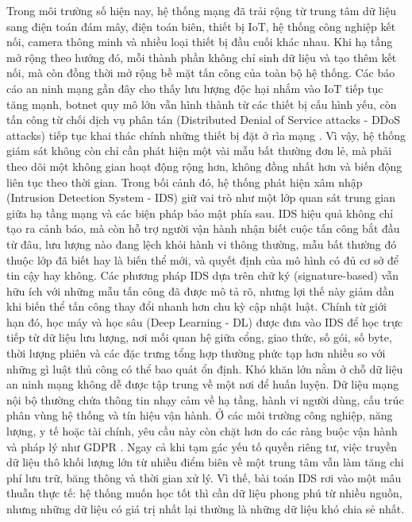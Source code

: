 Trong môi trường số hiện nay, hệ thống mạng đã trải rộng từ trung tâm dữ liệu sang điện toán đám mây, điện toán biên, thiết bị IoT, hệ thống công nghiệp kết nối, camera thông minh và nhiều loại thiết bị đầu cuối khác nhau. Khi hạ tầng mở rộng theo hướng đó, mỗi thành phần không chỉ sinh dữ liệu và tạo thêm kết nối, mà còn đồng thời mở rộng bề mặt tấn công của toàn bộ hệ thống. Các báo cáo an ninh mạng gần đây cho thấy lưu lượng độc hại nhắm vào IoT tiếp tục tăng mạnh, botnet quy mô lớn vẫn hình thành từ các thiết bị cấu hình yếu, còn tấn công từ chối dịch vụ phân tán (Distributed Denial of Service attacks - DDoS attacks) tiếp tục khai thác chính những thiết bị đặt ở rìa mạng \cite{sonicwall2024report,netgear2024report,hackernews2026report}. Vì vậy, hệ thống giám sát không còn chỉ cần phát hiện một vài mẫu bất thường đơn lẻ, mà phải theo dõi một không gian hoạt động rộng hơn, không đồng nhất hơn và biến động liên tục theo thời gian.
\bigbreak\noindent
Trong bối cảnh đó, hệ thống phát hiện xâm nhập (Intrusion Detection System - IDS) giữ vai trò như một lớp quan sát trung gian giữa hạ tầng mạng và các biện pháp bảo mật phía sau. IDS hiệu quả không chỉ tạo ra cảnh báo, mà còn hỗ trợ người vận hành nhận biết cuộc tấn công bắt đầu từ đâu, lưu lượng nào đang lệch khỏi hành vi thông thường, mẫu bất thường đó thuộc lớp đã biết hay là biến thể mới, và quyết định của mô hình có đủ cơ sở để tin cậy hay không. Các phương pháp IDS dựa trên chữ ký (signature-based) vẫn hữu ích với những mẫu tấn công đã được mô tả rõ, nhưng lợi thế này giảm dần khi biến thể tấn công thay đổi nhanh hơn chu kỳ cập nhật luật. Chính từ giới hạn đó, học máy và học sâu (Deep Learning - DL) được đưa vào IDS để học trực tiếp từ dữ liệu lưu lượng, nơi mối quan hệ giữa cổng, giao thức, số gói, số byte, thời lượng phiên và các đặc trưng tổng hợp thường phức tạp hơn nhiều so với những gì luật thủ công có thể bao quát ổn định.
\bigbreak\noindent
Khó khăn lớn nằm ở chỗ dữ liệu an ninh mạng không dễ được tập trung về một nơi để huấn luyện. Dữ liệu mạng nội bộ thường chứa thông tin nhạy cảm về hạ tầng, hành vi người dùng, cấu trúc phân vùng hệ thống và tín hiệu vận hành. Ở các môi trường công nghiệp, năng lượng, y tế hoặc tài chính, yêu cầu này còn chặt hơn do các ràng buộc vận hành và pháp lý như GDPR \cite{gdpr}. Ngay cả khi tạm gác yếu tố quyền riêng tư, việc truyền dữ liệu thô khối lượng lớn từ nhiều điểm biên về một trung tâm vẫn làm tăng chi phí lưu trữ, băng thông và thời gian xử lý. Vì thế, bài toán IDS rơi vào một mâu thuẫn thực tế: hệ thống muốn học tốt thì cần dữ liệu phong phú từ nhiều nguồn, nhưng những dữ liệu có giá trị nhất lại thường là những dữ liệu khó chia sẻ nhất.
